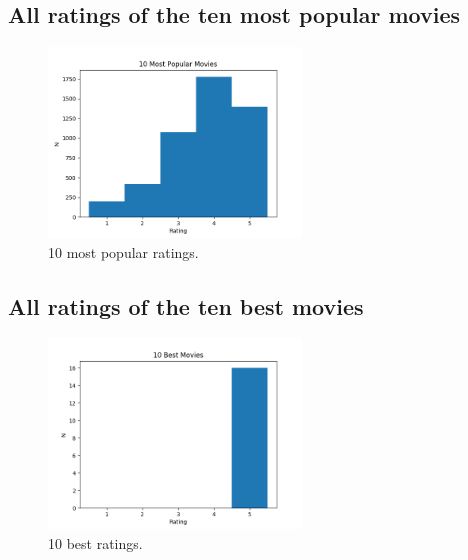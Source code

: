 \subsection{All ratings of the ten most popular movies}
    \begin{figure}[H]
    \centering
    \includegraphics[width=0.6\textwidth]{../Figures/10mostpopratings.png}
    \caption{10 most popular ratings.}
    \end{figure}
    
\subsection{All ratings of the ten best movies}    
    \begin{figure}[H]
    \centering
    \includegraphics[width=0.6\textwidth]{../Figures/10bestratings.png}
    \caption{10 best ratings.}
    \end{figure}

